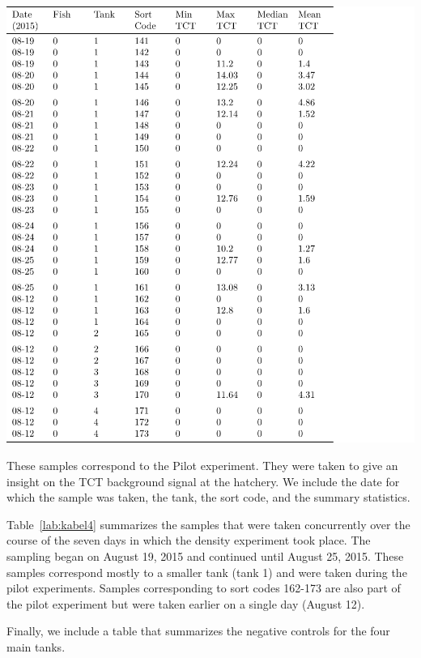 \begin{table}[H]
\includegraphics{Chapter3Images/kable4new.pdf}
\caption{  These samples correspond to the Pilot experiment. They were taken to give an insight on the TCT background signal at the hatchery. We include the date for which the sample was taken, the tank, the sort code, and the summary statistics.}
\label{lab:kabel4}
\end{table}

Table~\ref{lab:kabel4} summarizes the samples that were taken concurrently over the course of the seven days in which the density experiment took place. The sampling began on August 19, 2015 and continued until August 25, 2015. These samples correspond mostly to a smaller tank (tank 1) and were taken during the pilot experiments. Samples corresponding to sort codes 162-173 are also part of the pilot experiment but were taken earlier on a single day (August 12). 


Finally, we include a table that summarizes the negative controls for the four main tanks.

